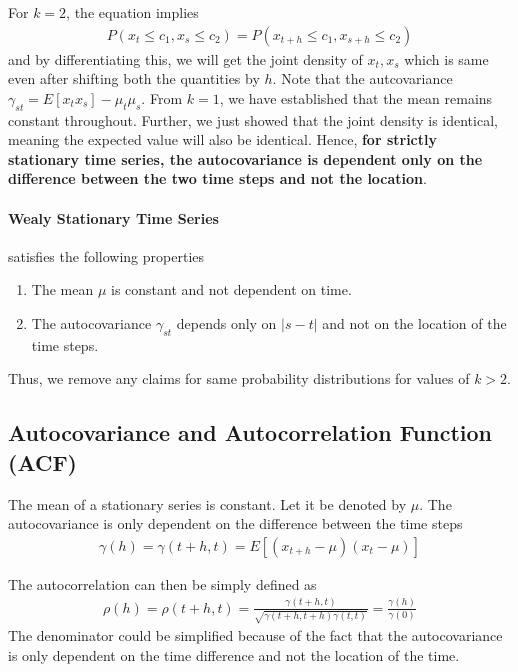 \documentclass[../../time_series_notes.tex]{subfiles}
\begin{document}
For $k=2$, the equation implies
\begin{align*}
    P(x_{t} \leq c_{1}, x_{s} \leq c_{2}) = P(x_{t+h} \leq c_{1}, x_{s+h} \leq c_{2})
\end{align*}
and by differentiating this, we will get the joint density of $x_{t}, x_{s}$ which is same even after shifting both the quantities by $h$. Note that the autcovariance $\gamma_{st} = E[x_{t} x_{s}] - \mu_{t} \mu_{s}$. From $k=1$, we have established that the mean remains constant throughout. Further, we just showed that the joint density is identical, meaning the expected value will also be identical. Hence, \textbf{for strictly stationary time series, the autocovariance is dependent only on the difference between the two time steps and not the location}.\newline

\paragraph{Wealy Stationary Time Series} satisfies the following properties
\begin{enumerate}
    \item The mean $\mu$ is constant and not dependent on time.
    \item The autocovariance $\gamma_{st}$ depends only on $\lvert s - t \rvert$ and not on the location of the time steps.
\end{enumerate}
Thus, we remove any claims for same probability distributions for values of $k > 2$.\newline

\subsection{Autocovariance and Autocorrelation Function (ACF)}
The mean of a stationary series is constant. Let it be denoted by $\mu$.\newline
The autocovariance is only dependent on the difference between the time steps
\begin{align*}
    \gamma (h) = \gamma(t+h,t) = E[(x_{t+h} - \mu)(x_{t} - \mu)]
\end{align*}

The autocorrelation can then be simply defined as
\begin{align*}
    \rho (h) = \rho(t+h, t) = \frac{\gamma (t+h,t)}{\sqrt{\gamma(t+h, t+h) \gamma(t, t)}} = \frac{\gamma(h)}{\gamma(0)}
\end{align*}
The denominator could be simplified because of the fact that the autocovariance is only dependent on the time difference and not the location of the time.\newline
\end{document}
